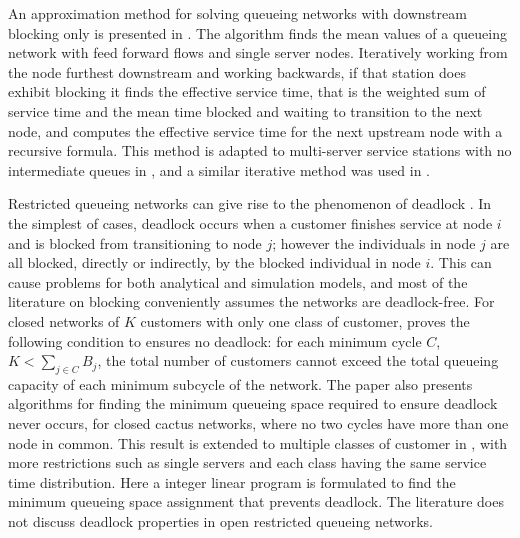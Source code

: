\documentclass{article}
\begin{document}
An approximation method for solving queueing networks with downstream blocking
only is presented in \cite{takahashi80}.
The algorithm finds the mean values of a queueing network with feed forward flows and single server nodes.
Iteratively working from the node furthest downstream and working backwards, if
that station does exhibit blocking it finds the effective service time, that is
the weighted sum of service time and the mean time blocked and waiting to
transition to the next node, and computes the effective service time for the
next upstream node with a recursive formula. %
This method is adapted to multi-server service stations with no intermediate queues in \cite{koizumietal05}, and a similar iterative method was used in \cite{korporaaletal00}.

Restricted queueing networks can give rise to the phenomenon of deadlock
\cite{}.
In the simplest of cases, deadlock occurs when a customer finishes service at node $i$ and is blocked from transitioning to node $j$; however the individuals in node $j$ are all blocked, directly or indirectly, by the blocked individual in node $i$.
This can cause problems for both analytical and simulation models, and most of
the literature on blocking conveniently assumes the networks are deadlock-free.
For closed networks of $K$ customers with only one class of customer, \cite{kunduakyildiz89} proves the following condition to ensures no deadlock: for each minimum cycle $C$, $K < \sum_{j\in C} B_j$, the total number of customers cannot exceed the total queueing capacity of each minimum subcycle of the network.
The paper also presents algorithms for finding the minimum queueing space required to ensure deadlock never occurs, for closed cactus networks, where no two cycles have more than one node in common.
This result is extended to multiple classes of customer in \cite{liebeherrakyildiz95}, with more restrictions such as single servers and each class having the same service time distribution.
Here a integer linear program is formulated to find the minimum queueing space assignment that prevents deadlock.
The literature does not discuss deadlock properties in open restricted queueing networks.

\end{document}
